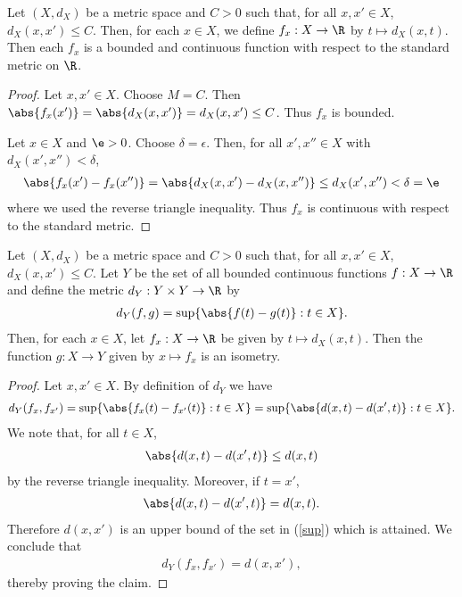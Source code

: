 \documentclass{article}
\begin{document}
\begin{claim*}[3]
   Let $(X,d_X)$ be a metric space and $C>0$ such that, for all $x,x'\in X$, $d_X(x,x')\leq C$.
   Then, for each $x\in X$, we define $f_x:X\to\R$ by $t\mapsto d_X(x,t)$. Then each $f_x$ is a 
   bounded and continuous function with respect to the standard metric on $\R$.
   \begin{proof}
      Let $x,x'\in X$. Choose $M=C$. Then $\abs{f_x(x')} = \abs{d_X(x,x')} = d_X(x,x') \leq C$. Thus $f_x$ is bounded. 

      Let $x\in X$ and $\e>0$. Choose $\delta=\epsilon$. Then, for all $x',x''\in X$
      with $d_X(x',x'')<\delta$,
      \begin{align*}
         \abs{f_x(x')-f_x(x'')} = \abs{d_X(x,x')-d_X(x,x'')} \leq d_X(x',x'') < \delta = \e
      \end{align*}
      where we used the reverse triangle inequality. Thus $f_x$ is continuous with respect to the 
      standard metric.
   \end{proof}
\end{claim*}

\begin{claim*}[4]
   Let $(X,d_X)$ be a metric space and $C>0$ such that, for all $x,x'\in X$, $d_X(x,x')\leq C$.
   Let $Y$ be the set of all bounded continuous functions $f:X\to\R$ and define the metric 
   $d_Y:Y\times Y\to\R$ by 
   \begin{align*}
      d_Y(f,g) = \sup\{\abs{f(t)-g(t)}:t\in X\}.
   \end{align*}
   Then, for each $x\in X$,  let $f_x:X\to\R$ be given by $t\mapsto d_X(x,t)$. Then the function 
   $g:X\to Y$ given by $x\mapsto f_x$ is an isometry.
   \begin{proof}
      Let $x,x'\in X$. By definition of $d_Y$ we have 
      \begin{align}
         \label{sup}
         d_Y(f_x,f_{x'}) = \sup\{\abs{f_x(t)-f_{x'}(t)}:t\in X\} 
         = \sup\{\abs{d(x,t)-d(x',t)}:t\in X\}.
      \end{align}    
      We note that, for all $t\in X$,
      \begin{align*}
         \abs{d(x,t)-d(x',t)}\leq d(x,t)
      \end{align*}
      by the reverse triangle inequality. Moreover, if $t=x'$, 
      \begin{align*}
         \abs{d(x,t)-d(x',t)}=d(x,t).
      \end{align*} 
      Therefore $d(x,x')$ is an upper bound of the set in (\ref{sup}) which is 
      attained. We conclude that
      \begin{align*}
         d_Y(f_x,f_{x'}) = d(x,x'),
      \end{align*}
      thereby proving the claim.
   \end{proof}
\end{claim*}
\end{document}
